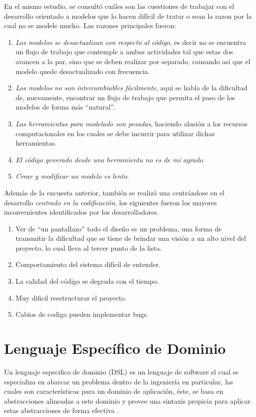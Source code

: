 En el mismo estudio, se consultó cuáles son las cuestiones de trabajar con el
desarrollo orientado a modelos que lo hacen difícil de tratar o sean la razon
por la cual no se modele mucho. Las razones principales fueron:
\begin{enumerate}
\item \textit{Los modelos se desactualizan con respecto al código},
es decir no se encuentra un flujo de trabajo que contemple a ambas
actividades tal que estas dos avancen a la par, sino que se deben
realizar por separado, causando así que el modelo quede desactualizado
con frecuencia.
\item \textit{Los modelos no son intercambiables fácilmente}, aquí se habla de la
dificultad de, nuevamente, encontrar un flujo de trabajo que permita el paso de
los modelos de forma más ``natural''.
\item \textit{Las herramientas para modelado son pesadas}, haciendo alusión a los
recursos computacionales en los cuales se debe incurrir para utilizar dichas
herramientas.
\item \textit{El código generado desde una herramienta no es de mi agrado}.
\item \textit{Crear y modificar un modelo es lento}.
\end{enumerate}

Además de la encuesta anterior, también se realizó
una centrándose en el desarrollo \textit{centrado en la codificación}, los
siguientes fueron los mayores inconvenientes identificados por los desarrolladores.

\begin{enumerate}
	\item Ver de ``un pantallazo'' todo el diseño es un problema, una forma de
		transmitir la dificultad que se tiene de brindar una visión a un alto nivel
		del proyecto, lo cual lleva al tercer punto de la lista.
	\item Comportamiento del sistema difícil de entender.
	\item La calidad del código se degrada con el tiempo.
	\item Muy dificil reestructurar el proyecto.
	\item Cabios de codigo pueden implementar bugs.
\end{enumerate}



\section{Lenguaje Específico de Dominio}
\label{sub:introestadocuestion}
Un lenguaje especifico de dominio (DSL) es un lenguaje de software el cual se
especializa en abarcar un problema dentro de la ingeniería en particular, las
cuales son características para un dominio de aplicación, éste, se basa en
abstracciones alineadas a este dominio y provee una sintaxis propicia para
aplicar estas abstracciones de forma efectiva \cite{sobernig2015}.


